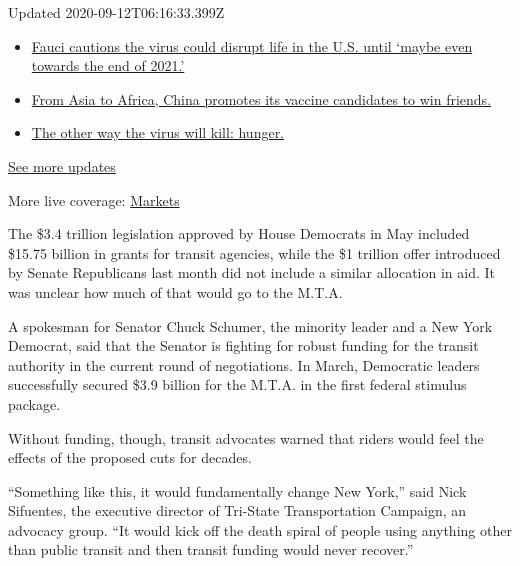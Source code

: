 Updated 2020-09-12T06:16:33.399Z

\begin{itemize}
\tightlist
\item
  \href{https://www.nytimes3xbfgragh.onion/2020/09/11/world/covid-19-coronavirus.html?action=click\&pgtype=Article\&state=default\&region=MAIN_CONTENT_1\&context=storylines_live_updates\#link-dfb8a16}{Fauci
  cautions the virus could disrupt life in the U.S. until `maybe even
  towards the end of 2021.'}
\item
  \href{https://www.nytimes3xbfgragh.onion/2020/09/11/world/covid-19-coronavirus.html?action=click\&pgtype=Article\&state=default\&region=MAIN_CONTENT_1\&context=storylines_live_updates\#link-7104d154}{From
  Asia to Africa, China promotes its vaccine candidates to win friends.}
\item
  \href{https://www.nytimes3xbfgragh.onion/2020/09/11/world/covid-19-coronavirus.html?action=click\&pgtype=Article\&state=default\&region=MAIN_CONTENT_1\&context=storylines_live_updates\#link-393ad215}{The
  other way the virus will kill: hunger.}
\end{itemize}

\href{https://www.nytimes3xbfgragh.onion/2020/09/11/world/covid-19-coronavirus.html?action=click\&pgtype=Article\&state=default\&region=MAIN_CONTENT_1\&context=storylines_live_updates}{See
more updates}

More live coverage:
\href{https://www.nytimes3xbfgragh.onion/live/2020/09/11/business/stock-market-today-coronavirus?action=click\&pgtype=Article\&state=default\&region=MAIN_CONTENT_1\&context=storylines_live_updates}{Markets}

The \$3.4 trillion legislation approved by House Democrats in May
included \$15.75 billion in grants for transit agencies, while the \$1
trillion offer introduced by Senate Republicans last month did not
include a similar allocation in aid. It was unclear how much of that
would go to the M.T.A.

A spokesman for Senator Chuck Schumer, the minority leader and a New
York Democrat, said that the Senator is fighting for robust funding for
the transit authority in the current round of negotiations. In March,
Democratic leaders successfully secured \$3.9 billion for the M.T.A. in
the first federal stimulus package.

Without funding, though, transit advocates warned that riders would feel
the effects of the proposed cuts for decades.

``Something like this, it would fundamentally change New York,'' said
Nick Sifuentes, the executive director of Tri-State Transportation
Campaign, an advocacy group. ``It would kick off the death spiral of
people using anything other than public transit and then transit funding
would never recover.''

